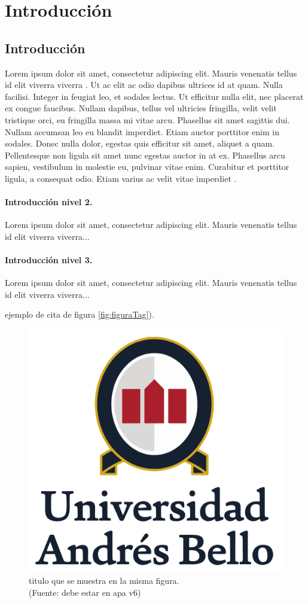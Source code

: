 \chapter{Introducción}

\section{Introducción}

Lorem ipsum dolor sit amet, consectetur adipiscing elit. Mauris venenatis tellus id elit viverra viverra \citep{adams1995hitchhiker}. Ut ac elit ac odio dapibus ultrices id at quam. Nulla facilisi. Integer in feugiat leo, et sodales lectus. Ut efficitur nulla elit, nec placerat ex congue faucibus. Nullam dapibus, tellus vel ultricies fringilla, velit velit tristique orci, eu fringilla massa mi vitae arcu. Phasellus sit amet sagittis dui. Nullam accumsan leo eu blandit imperdiet. Etiam auctor porttitor enim in sodales. Donec nulla dolor, egestas quis efficitur sit amet, aliquet a quam. Pellentesque non ligula sit amet nunc egestas auctor in at ex. Phasellus arcu sapien, vestibulum in molestie eu, pulvinar vitae enim. Curabitur et porttitor ligula, a consequat odio. Etiam varius ac velit vitae imperdiet \citep{Codishetal2000}.


\subsubsection{Introducción nivel 2.}
Lorem ipsum dolor sit amet, consectetur adipiscing elit. Mauris venenatis tellus id elit viverra viverra...

\subsubsection{Introducción nivel 3.}
Lorem ipsum dolor sit amet, consectetur adipiscing elit. Mauris venenatis tellus id elit viverra viverra...

ejemplo de cita de figura \autoref{fig:figuraTag}).

\begin{figure}[h]
\centering
\includegraphics[width=.7\textwidth]{figures/logo-portada.png}
\caption[titulo en indice]{titulo que se muestra en la misma figura.\\
{\scriptsize (Fuente: debe estar en apa v6)}}
\label{fig:figuraTag}
\end{figure}

